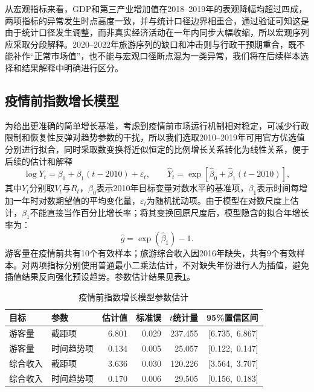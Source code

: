 \documentclass[withoutpreface,bwprint]{cumcmthesis}
\begin{document}
从宏观指标来看，GDP和第三产业增加值在2018--2019年的表观降幅均超过四成，两项指标的异常发生时点高度一致，并与统计口径边界相重合，通过验证可知这是由于统计口径发生调整，而非真实经济活动在一年内同步大幅收缩，所以宏观序列应采取分段解释。2020--2022年旅游序列的缺口和冲击则与行政干预期重合，既不能补作“正常市场值”，也不能与宏观口径断点混为一类异常，我们将在后续样本选择和结果解释中明确进行区分。

\subsection{疫情前指数增长模型}

为给出更准确的简单增长基准，考虑到疫情前市场运行机制相对稳定，可减少行政限制和恢复性反弹对趋势参数的干扰，所以我们选取2010--2019年可用官方优选值分别进行拟合，同时采取数变换将近似恒定的比例增长关系转化为线性关系，便于后续的估计和解释
\begin{equation}
\log Y_t=\beta_0+\beta_1(t-2010)+\varepsilon_t,
\qquad
\widehat Y_t=\exp\!\left[\widehat\beta_0+
\widehat\beta_1(t-2010)\right],
\label{eq:q1_exp_model}
\end{equation}
其中$Y_t$分别取$V_t$与$R_t$，$\beta_0$表示2010年目标变量对数水平的基准项，$\beta_1$表示时间每增加一年时对数期望值的平均变化量，$\varepsilon_t$为随机扰动项。由于模型在对数尺度上估计，$\beta_1$不能直接当作百分比增长率；将其变换回原尺度后，模型隐含的拟合年增长率为：
\begin{equation}
\widehat g=\exp(\widehat\beta_1)-1.
\label{eq:q1_growth}
\end{equation}
游客量在疫情前共有10个有效样本；旅游综合收入因2016年缺失，共有9个有效样本。对两项指标分别使用普通最小二乘法估计，不对缺失年份进行人为插值，避免插值结果反向强化预设趋势。参数估计结果见表\ref{tab:q1_parameters}。

\begin{table}[H]
\centering
\caption{疫情前指数增长模型参数估计}
\label{tab:q1_parameters}
\small
\renewcommand{\arraystretch}{1.08}
\begin{tabular}{llrrrr}
\toprule
目标 & 参数 & 估计值 & 标准误 & $t$统计量 & 95\%置信区间 \\
\midrule
游客量 & 截距项 & 6.801 & 0.029 & 237.455 & [6.735,\ 6.867] \\
游客量 & 时间趋势项 & 0.134 & 0.005 & 25.057 & [0.122,\ 0.147] \\
综合收入 & 截距项 & 3.636 & 0.030 & 120.226 & [3.564,\ 3.707] \\
综合收入 & 时间趋势项 & 0.170 & 0.006 & 29.505 & [0.156,\ 0.183] \\
\bottomrule
\end{tabular}
\end{table}
\end{document}
